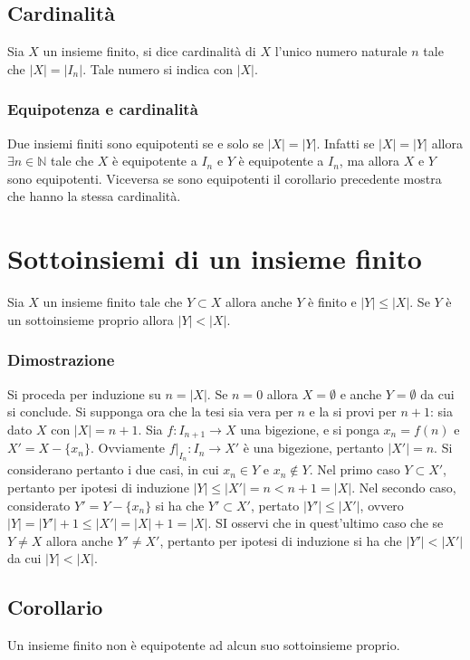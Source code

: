 \subsection{Cardinalit\`a}
Sia $X$ un insieme finito, si dice cardinalit\`a di $X$ l'unico numero naturale $n$ tale che $|X|=|I_n|$. Tale numero si indica con $|X|$.
\subsubsection{Equipotenza e cardinalit\`a}
Due insiemi finiti sono equipotenti se e solo se $|X|=|Y|$. Infatti se $|X|=|Y|$ allora $\exists n\in\mathbb{N}$ tale che $X$ \`e equipotente a $I_n$ e $Y$ \`e
equipotente a $I_n$, ma allora $X$ e $Y$ sono equipotenti. Viceversa se sono equipotenti il corollario precedente mostra che hanno la stessa cardinalit\`a.
\section{Sottoinsiemi di un insieme finito}
Sia $X$ un insieme finito tale che $Y\subset X$ allora anche $Y$ \`e finito e $|Y|\le |X|$. Se $Y$ \`e un sottoinsieme proprio allora $|Y|<|X|$.
\subsubsection{Dimostrazione}
Si proceda per induzione su $n=|X|$. Se $n=0$ allora $X=\emptyset$ e anche $Y=\emptyset$ da cui si conclude. Si supponga ora che la tesi sia vera per $n$ e la
si provi per $n+1$: sia dato $X$ con $|X|=n+1$. Sia $f:I_{n+1}\rightarrow X$ una bigezione, e si ponga $x_n=f(n)$ e $X'=X-\{x_n\}$. Ovviamente $f|_{I_n}:I_n
\rightarrow X'$  \`e una bigezione, pertanto $|X'|=n$. Si considerano pertanto i due casi, in cui $x_n\in Y$ e $x_n\not\in Y$. Nel primo caso $Y\subset X'$, 
pertanto per ipotesi di induzione $|Y|\le|X'|=n<n+1=|X|$. Nel secondo caso, considerato $Y'=Y-\{x_n\}$ si ha che $Y'\subset X'$, pertato $|Y'|\le|X'|$, ovvero
$|Y|=|Y'|+1\le |X'|=|X|+1=|X|$. SI osservi che in quest'ultimo caso che se $Y\neq X$ allora anche $Y'\neq X'$, pertanto per ipotesi di induzione si ha che 
$|Y'|<|X'|$ da cui $|Y|<|X|$.
\subsection{Corollario}
Un insieme finito non \`e equipotente ad alcun suo sottoinsieme proprio.